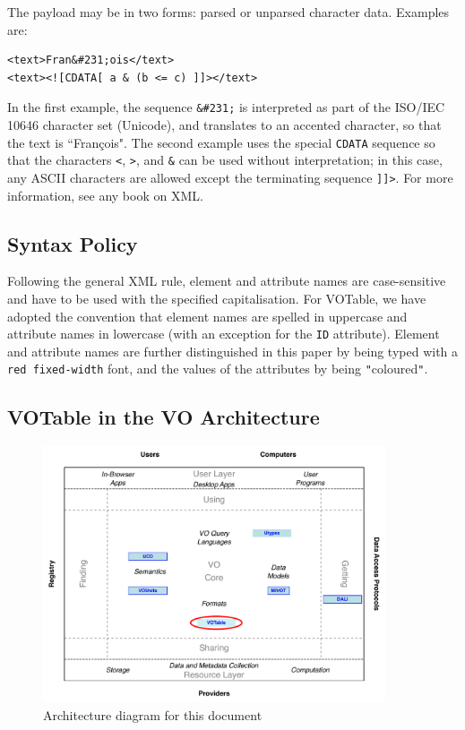 \documentclass[11pt,a4paper]{ivoa}
\let\fg=\color
\def\attr#1{{\tt{\fg{DarkRed}#1}}}
\def\literalvalue#1{{\tt"}{{\fg{DarkPurple}#1}}{\tt"}}
\begin{document}
The payload may be in two forms: parsed or unparsed character
data. Examples are:

\begin{verbatim}
<text>Fran&#231;ois</text>
<text><![CDATA[ a & (b <= c) ]]></text>
\end{verbatim}

In the first example, the sequence {\tt \&\#231;} is interpreted as
part of the ISO/IEC 10646 character set (Unicode), and translates to an
accented character, so that the text is ``Fran\c{c}ois".
The second example uses the special {\tt CDATA} sequence so that the
characters {\tt <}, {\tt >}, and {\tt\&} can be used without interpretation;
in this case, any ASCII characters are allowed except the terminating
sequence {\tt]]>}. For more information, see any book on
XML.


\subsection{Syntax Policy}

Following the general XML rule, element and attribute names are
case-sensitive and have to be used with the specified
capitalisation. For VOTable, we have adopted the convention that
element names are spelled in uppercase
and attribute names in lowercase (with an
exception for the {\attr{ID}}
attribute).
Element and attribute names are further distinguished in
this paper by being typed with a {\attr{red fixed-width}} font,
and the values of the attributes by being \literalvalue{coloured}.


\subsection{VOTable in the VO Architecture}
\label{sec:voarch}

\begin{figure}
\centering
\includegraphics[width=0.9\textwidth]{role_diagram.pdf}
\caption{Architecture diagram for this document}
\label{fig:archdiag}
\end{figure}
\end{document}
